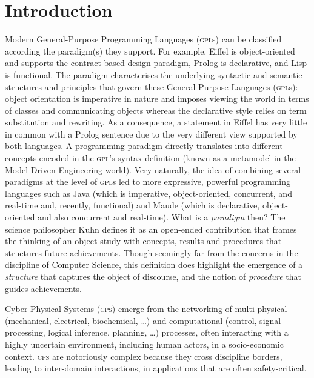 \section{Introduction}
\label{sec:Introduction}

Modern General-Purpose Programming Languages (\textsc{gpl}s) can be
classified according the paradigm(s) they support.
For example, Eiffel is object-oriented and supports the contract-based-design
paradigm, Prolog is declarative, and Lisp is functional. The paradigm
characterises the underlying syntactic and semantic structures and principles
that govern these General Purpose Languages (\textsc{gpl}s): 
object orientation is imperative in nature and
imposes viewing the world in terms of classes and communicating objects whereas the
declarative style relies on term substitution and rewriting.
As a consequence, a statement in Eiffel has very little
in common with a Prolog sentence due to the very different view supported by
both languages.
A programming paradigm directly translates into different concepts encoded in
the \textsc{gpl}'s syntax definition (known as a metamodel in the
Model-Driven Engineering world).
Very naturally, the idea of combining several paradigms at the level of
\textsc{gpl}s led to more expressive, powerful programming languages such as
Java (which is imperative, object-oriented, concurrent, and real-time and,
recently, functional) and Maude (which is declarative, object-oriented and also
concurrent and real-time).
What is a \emph{paradigm} then? The science philosopher Kuhn \cite{B:Kuhn:2012}
defines it as an
open-ended contribution that frames the thinking of an object study with
concepts, results and procedures that structures future achievements. Though
seemingly far from the concerns in the discipline of Computer Science, this
definition does highlight the emergence of a \emph{structure} that
captures the object of discourse, and the notion of \emph{procedure} that guides
achievements.


Cyber-Physical Systems (\textsc{cps}) emerge from the networking of multi-physical  (mechanical, electrical, biochemical, \ldots) and computational (control, signal processing, logical inference, planning, \ldots) processes, often interacting with a highly uncertain environment, including human actors, in a socio-economic context.
\textsc{cps} are notoriously complex because they cross discipline borders,
leading to inter-domain interactions, in applications that are often
safety-critical.

